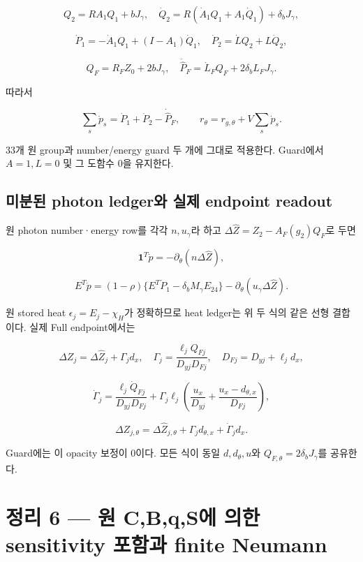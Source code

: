 \[
Q_2=RA_1Q_1+bJ_\gamma,\quad
\dot Q_2=R(\dot A_1Q_1+A_1\dot Q_1)+\delta_bJ_\gamma,
\]

\[
\dot P_1=-\dot A_1Q_1+(I-A_1)\dot Q_1,
\quad \dot P_2=\dot LQ_2+L\dot Q_2,
\]

\[
Q_F=R_FZ_0+2bJ_\gamma,\quad
\dot{\widehat P}_F=\dot L_FQ_F+2\delta_bL_FJ_\gamma.
\]

따라서

\[
\boxed{\sum_s\dot p_s=\dot P_1+\dot P_2-\dot{\widehat P}_F,
\qquad r_\theta=r_{g,\theta}+V\sum_s\dot p_s.}
\tag{20}
\]

33개 원 group과 number/energy guard 두 개에 그대로 적용한다. Guard에서 \(A=1,L=0\) 및 그 도함수 0을 유지한다.

\hypertarget{uxbbf8uxbd84uxb41c-photon-ledgeruxc640-uxc2e4uxc81c-endpoint-readout}{%
\subsection{미분된 photon ledger와 실제 endpoint readout}\label{uxbbf8uxbd84uxb41c-photon-ledgeruxc640-uxc2e4uxc81c-endpoint-readout}}

원 photon number·energy row를 각각 \(n,u_\gamma\)라 하고 \(\Delta\widehat Z=Z_2-A_F(g_2)Q_F\)로 두면

\[
\mathbf1^T\dot p=-\partial_\theta(n\Delta\widehat Z),
\]

\[
E^T\dot p=(1-\rho)\{E^T\dot P_1-\delta_bM_\gamma E_{24}\}
-\partial_\theta(u_\gamma\Delta\widehat Z).
\tag{21}
\]

원 stored heat \(\epsilon_j=E_j-\chi_H\)가 정확하므로 heat ledger는 위 두 식의 같은 선형 결합이다. 실제 Full endpoint에서는

\[
\Delta Z_j=\Delta\widehat Z_j+\Gamma_jd_x,
\quad \Gamma_j=\frac{\ell_jQ_{Fj}}{D_{yj}D_{Fj}},
\quad D_{Fj}=D_{yj}+\ell_jd_x,
\]

\[
\dot\Gamma_j=\frac{\ell_j\dot Q_{Fj}}{D_{yj}D_{Fj}}
+\Gamma_j\ell_j\left(\frac{u_x}{D_{yj}}+
\frac{u_x-d_{\theta,x}}{D_{Fj}}\right),
\]

\[
\boxed{\Delta Z_{j,\theta}=\Delta\widehat Z_{j,\theta}
+\Gamma_jd_{\theta,x}+\dot\Gamma_jd_x.}
\tag{22}
\]

Guard에는 이 opacity 보정이 0이다. 모든 식이 동일 \(d,d_\theta,u\)와 \(Q_{F,\theta}=2\delta_bJ_\gamma\)를 공유한다.

\hypertarget{uxc815uxb9ac-6-uxc6d0-cbqsuxc5d0-uxc758uxd55c-sensitivity-uxd3ecuxd568uxacfc-finite-neumann}{%
\section{정리 6 --- 원 C,B,q,S에 의한 sensitivity 포함과 finite Neumann}\label{uxc815uxb9ac-6-uxc6d0-cbqsuxc5d0-uxc758uxd55c-sensitivity-uxd3ecuxd568uxacfc-finite-neumann}}

